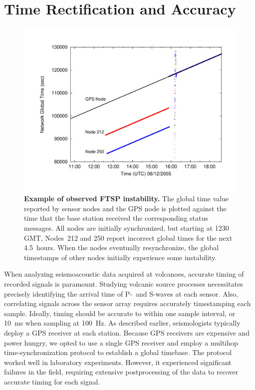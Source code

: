 \section{Time Rectification and Accuracy}
\label{evaluation-sec-timing}

\begin{figure}[t!]
\begin{center}
\includegraphics[width=\hsize]{./3-evaluation/figs/globaltimeproblem.pdf}
\end{center} 

\caption{\textbf{Example of observed FTSP instability.} The global time value
reported by sensor nodes and the GPS node is plotted against the time that
the base station received the corresponding status messages. All nodes are
initially synchronized, but starting at 1230 GMT, Nodes~212 and 250 report
incorrect global times for the next 4.5~hours. When the nodes eventually
resynchronize, the global timestamps of other nodes initially experience some
instability.}

\label{evaluation-fig-globaltimeproblem}
\end{figure}

When analyzing seismoacoustic data acquired at volcanoes, accurate timing of
recorded signals is paramount. Studying volcanic source processes
necessitates precisely identifying the arrival time of P-~and S-waves at each
sensor. Also, correlating signals across the sensor array requires accurately
timestamping each sample. Ideally, timing should be accurate to within one
sample interval, or 10~ms when sampling at 100~Hz. As described earlier,
seismologists typically deploy a GPS receiver at each station. Because GPS
receivers are expensive and power hungry, we opted to use a single GPS
receiver and employ a multihop time-synchronization protocol to establish a
global timebase. The protocol worked well in laboratory experiments. However,
it experienced significant failures in the field, requiring extensive
postprocessing of the data to recover accurate timing for each signal.

